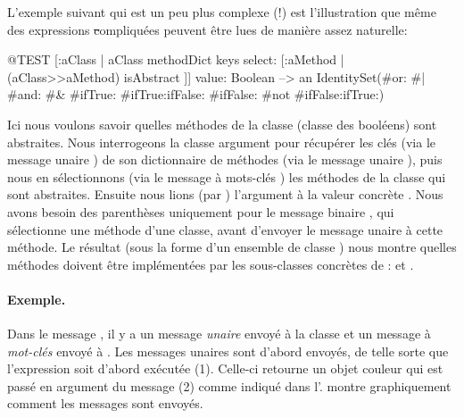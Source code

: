 \documentclass[a4paper,10pt,twoside]{book}
\begin{document}
L'exemple suivant qui est un peu plus complexe (!) est l'illustration que m\^eme des expressions \st compliqu\'ees peuvent \^etre lues de mani\`ere assez naturelle: 
\begin{code}{@TEST}
[:aClass | aClass methodDict keys select: [:aMethod | (aClass>>aMethod) isAbstract ]] value: Boolean --> an IdentitySet(#or: #| #and: #& #ifTrue: #ifTrue:ifFalse: #ifFalse: #not #ifFalse:ifTrue:)
\end{code}
\noindent
Ici nous voulons savoir quelles m\'ethodes de la classe 
(classe des bool\'eens) sont abstraites.
Nous interrogeons la classe argument  pour r\'ecup\'erer
les cl\'es (via le message unaire ) de son dictionnaire de
m\'ethodes (via le message unaire ), puis nous en
s\'electionnons (via le message \`a mots-cl\'es ) les
m\'ethodes de la classe qui sont abstraites.
Ensuite nous lions (par ) l'argument  \`a la
valeur concr\`ete .
Nous avons besoin des parenth\`eses uniquement pour le message binaire
\ct{>>}, qui s\'electionne une m\'ethode d'une classe, avant d'envoyer
le message unaire \mbox{} \`a cette m\'ethode. Le
r\'esultat (sous la forme d'un ensemble de classe )
nous montre quelles m\'ethodes doivent \^etre impl\'ement\'ees par les
sous-classes concr\`etes de :  et .



\paragraph{Exemple.}
Dans le message , il y a un message \emph{unaire}  envoy\'e \`a la classe  et un message \`a \emph{mot-cl\'es}  envoy\'e \`a . Les messages unaires sont d'abord envoy\'es, de telle sorte que l'expression  soit d'abord ex\'ecut\'ee (1). Celle-ci retourne un objet couleur qui est pass\'e en argument du message  (2) comme indiqu\'e dans l'.
 montre graphiquement comment les messages sont envoy\'es.
\end{document}
